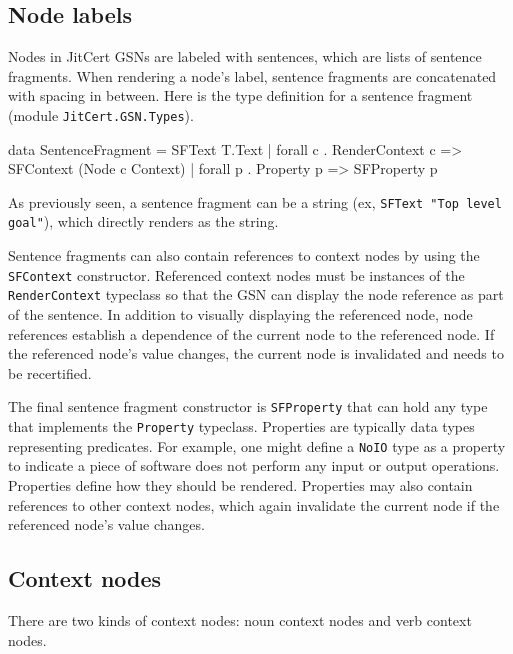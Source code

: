 \documentclass{article}
\newcommand{\jitcert}{JitCert\xspace}
\begin{document}
\subsection{Node labels} %

Nodes in \jitcert GSNs are labeled with sentences, which are lists of sentence fragments. 
When rendering a node's label, sentence fragments are concatenated with spacing in between. 
Here is the type definition for a sentence fragment (module \texttt{JitCert.GSN.Types}). 
\begin{mcode}
data SentenceFragment =
    SFText T.Text
  | forall c . RenderContext c => SFContext (Node c Context)
  | forall p . Property p => SFProperty p
\end{mcode} %
As previously seen, a sentence fragment can be a string (ex, \texttt{SFText "Top level goal"}), which directly renders as the string.

Sentence fragments can also contain references to context nodes by using the \texttt{SFContext} constructor.  
Referenced context nodes must be instances of the \texttt{RenderContext} typeclass so that the GSN can display the node reference as part of the sentence. 
In addition to visually displaying the referenced node, 
node references establish a dependence of the current node to the referenced node. 
If the referenced node's value changes, the current node is invalidated and needs to be recertified. 


The final sentence fragment constructor is \texttt{SFProperty} that can hold any type that implements the \texttt{Property} typeclass. 
Properties are typically data types representing predicates. 
For example, one might define a \texttt{NoIO} type as a property to indicate a piece of software does not perform any input or output operations.
Properties define how they should be rendered. 
Properties may also contain references to other context nodes, which again invalidate the current node if the referenced node's value changes.

\subsection{Context nodes}
\label{subsec:contextnodes}

There are two kinds of context nodes: noun context nodes and verb context nodes. 
\end{document}
